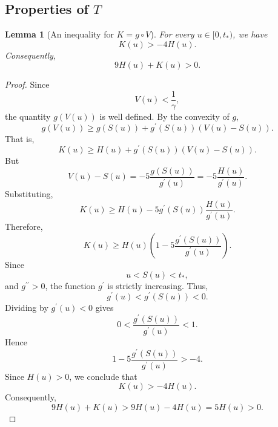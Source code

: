 \documentclass[11pt,a4paper]{article}
\numberwithin{equation}{section}
\numberwithin{table}{section}
\theoremstyle{plain}
\newtheorem{lemma}[theorem]{Lemma}
\theoremstyle{definition}\newtheorem{definition}[theorem]{Definition}
\theoremstyle{remark}\newtheorem{remark}[theorem]{Remark}
\begin{document}
\subsection{Properties of \texorpdfstring{$T$}{T}}

\begin{lemma}[An inequality for $K=g\circ V$]\label{supp:s2lemma6}
For every $u\in[0,t_*)$, we have 
\begin{equation*}
K(u)>-4H(u).
\end{equation*}
Consequently, 
\begin{equation*}
9H(u)+K(u)>0.
\end{equation*}
\end{lemma}

\begin{proof}
Since 
\begin{equation*}
V(u)<\frac1\gamma,
\end{equation*}
the quantity $g(V(u))$ is well defined. By the convexity of $g$, 
\begin{equation*}
g(V(u))\geq g(S(u))+g^{\prime}(S(u))(V(u)-S(u)).
\end{equation*}
That is, 
\begin{equation*}
K(u)\geq H(u)+g^{\prime}(S(u))(V(u)-S(u)).
\end{equation*}
But 
\begin{equation*}
V(u)-S(u)=-5\frac{g(S(u))}{g^{\prime}(u)}=-5\frac{H(u)}{g^{\prime}(u)}.
\end{equation*}
Substituting, 
\begin{equation*}
K(u)\geq H(u)-5g^{\prime}(S(u))\frac{H(u)}{g^{\prime}(u)}.
\end{equation*}
Therefore, 
\begin{equation*}
K(u)\geq H(u)\left(1-5\frac{g^{\prime}(S(u))}{g^{\prime}(u)}\right).
\end{equation*}
Since 
\begin{equation*}
u<S(u)<t_*,
\end{equation*}
and $g^{\prime\prime}>0$, the function $g^{\prime}$ is strictly
increasing. Thus, 
\begin{equation*}
g^{\prime}(u)<g^{\prime}(S(u))<0.
\end{equation*}
Dividing by $g^{\prime}(u)<0$ gives 
\begin{equation*}
0<\frac{g^{\prime}(S(u))}{g^{\prime}(u)}<1.
\end{equation*}
Hence 
\begin{equation*}
1-5\frac{g^{\prime}(S(u))}{g^{\prime}(u)}>-4.
\end{equation*}
Since $H(u)>0$, we conclude that 
\begin{equation*}
K(u)>-4H(u).
\end{equation*}
Consequently, 
\begin{equation*}
9H(u)+K(u)>9H(u)-4H(u)=5H(u)>0.
\end{equation*}
\end{proof}
\end{document}
